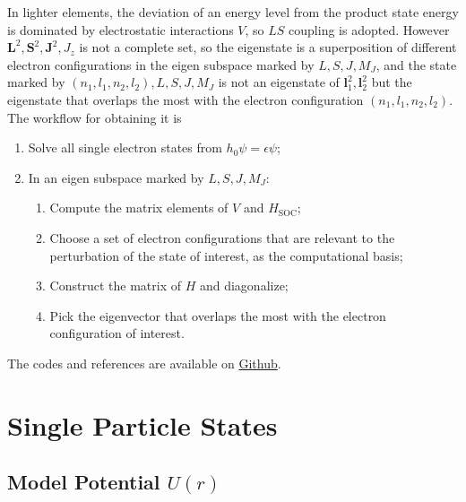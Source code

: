 \documentclass{article}
\begin{document}
In lighter elements, the deviation of an energy level from the product state energy is dominated by electrostatic interactions $V$, so $LS$ coupling is adopted. However $\bm{L}^2, \bm{S}^2, \bm{J}^2, J_z$ is not a complete set, so the eigenstate is a superposition of different electron configurations in the eigen subspace marked by $L,S,J,M_J$, and the state marked by $(n_1,l_1,n_2,l_2), L,S,J,M_J$ is not an eigenstate of $\bm{l}_1^2, \bm{l}_2^2$ but the eigenstate that overlaps the most with the electron configuration $(n_1,l_1,n_2,l_2)$. The workflow for obtaining it is
\begin{enumerate}
\item Solve all single electron states from $h_0 \psi = \epsilon \psi$;
\item In an eigen subspace marked by $L,S,J,M_J$:
\begin{enumerate}[(1)]
\item Compute the matrix elements of $V$ and $H_\mathrm{SOC}$;
\item Choose a set of electron configurations that are relevant to the perturbation of the state of interest, as the computational basis;
\item Construct the matrix of $H$ and diagonalize;
\item Pick the eigenvector that overlaps the most with the electron configuration of interest.
\end{enumerate}
\end{enumerate}

The codes and references are available on \href{https://github.com/congzlwag/CaAtomSpec}{Github}.
\section{Single Particle States}
\subsection{Model Potential $U(r)$}
\end{document}

